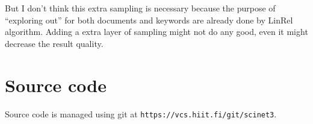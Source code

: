 \documentclass[10pt,a4paper]{article}
\begin{document}
But I don't think this extra sampling is necessary because the purpose of ``exploring out'' for both documents and keywords are already done by LinRel algorithm. Adding a extra layer of sampling might not do any good, even it might decrease the result quality.

\section{Source code}

Source code is managed using git at \verb+https://vcs.hiit.fi/git/scinet3+.


\newpage 

\listoffigures
\newpage
\listoftables
\newpage
\end{document}
